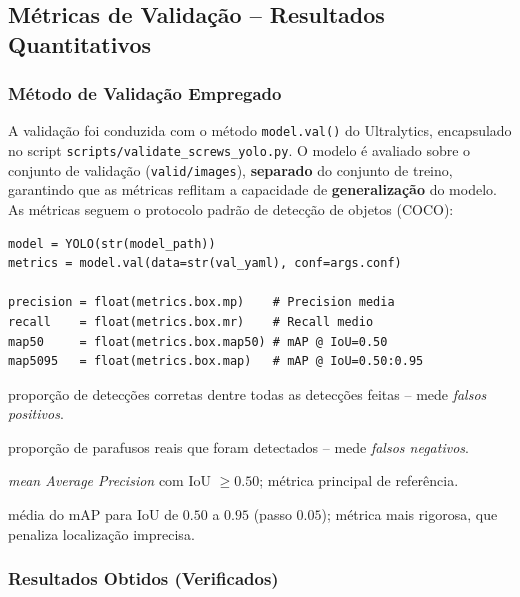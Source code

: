 \documentclass[12pt,a4paper]{article}
\begin{document}
\subsection{M\'etricas de Valida\c{c}\~ao -- Resultados Quantitativos}
\label{sec:metricas-yolo}

\subsubsection{M\'etodo de Valida\c{c}\~ao Empregado}

A valida\c{c}\~ao foi conduzida com o m\'etodo \texttt{model.val()} do Ultralytics,
encapsulado no script \texttt{scripts/validate\_screws\_yolo.py}. O modelo \'e avaliado
sobre o conjunto de valida\c{c}\~ao (\texttt{valid/images}), \textbf{separado} do conjunto
de treino, garantindo que as m\'etricas reflitam a capacidade de \textbf{generaliza\c{c}\~ao}
do modelo. As m\'etricas seguem o protocolo padr\~ao de detec\c{c}\~ao de objetos (COCO):

\begin{lstlisting}[caption={Extra\c{c}\~ao das m\'etricas de valida\c{c}\~ao (\texttt{validate\_screws\_yolo.py})}]
model = YOLO(str(model_path))
metrics = model.val(data=str(val_yaml), conf=args.conf)

precision = float(metrics.box.mp)    # Precision media
recall    = float(metrics.box.mr)    # Recall medio
map50     = float(metrics.box.map50) # mAP @ IoU=0.50
map5095   = float(metrics.box.map)   # mAP @ IoU=0.50:0.95
\end{lstlisting}

\begin{description}[leftmargin=*, style=nextline]
  \item[Precision (P):] propor\c{c}\~ao de detec\c{c}\~oes corretas dentre todas as
    detec\c{c}\~oes feitas -- mede \emph{falsos positivos}.
  \item[Recall (R):] propor\c{c}\~ao de parafusos reais que foram detectados --
    mede \emph{falsos negativos}.
  \item[mAP50:] \emph{mean Average Precision} com IoU $\geq 0.50$; m\'etrica principal
    de refer\^encia.
  \item[mAP50-95:] m\'edia do mAP para IoU de $0.50$ a $0.95$ (passo $0.05$);
    m\'etrica mais rigorosa, que penaliza localiza\c{c}\~ao imprecisa.
\end{description}

\subsubsection{Resultados Obtidos (Verificados)}
\end{document}
